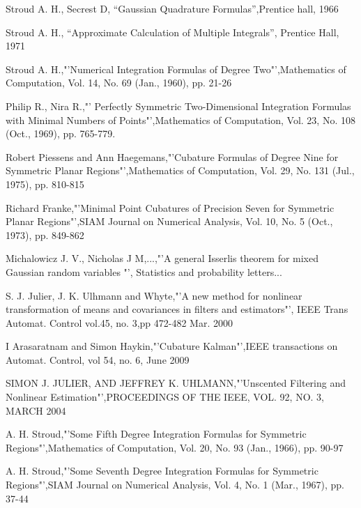 \documentclass[letterpaper, 10 pt, conference]{ieeeconf}  %
\begin{document}
\begin{thebibliography}{99}

Stroud A. H., Secrest D, "`Gaussian Quadrature Formulas"',Prentice hall, 1966

Stroud A. H., "`Approximate Calculation of Multiple Integrals"', Prentice Hall, 1971

Stroud A. H.,"'Numerical Integration Formulas of Degree Two"',Mathematics of Computation, Vol. 14, No. 69 (Jan., 1960), pp. 21-26

Philip R., Nira R.,"' Perfectly Symmetric Two-Dimensional Integration Formulas with Minimal Numbers of Points"',Mathematics of Computation, Vol. 23, No. 108 (Oct., 1969), pp. 765-779.

Robert Piessens and Ann Haegemans,"'Cubature Formulas of Degree Nine for Symmetric Planar Regions"',Mathematics of Computation, Vol. 29, No. 131 (Jul., 1975), pp. 810-815

Richard Franke,"'Minimal Point Cubatures of Precision Seven for Symmetric Planar Regions"',SIAM Journal on Numerical Analysis, Vol. 10, No. 5 (Oct., 1973), pp. 849-862

Michalowicz J. V., Nicholas J M,...,"'A general Isserlis theorem for mixed Gaussian random variables "', Statistics and probability letters...

S. J. Julier, J. K. Ulhmann and Whyte,"'A new method for nonlinear transformation of means and covariances in filters and estimators"', IEEE Trans Automat. Control vol.45, no. 3,pp 472-482 Mar. 2000

I Arasaratnam and Simon Haykin,"'Cubature Kalman"',IEEE transactions on Automat. Control, vol 54, no. 6, June 2009

SIMON J. JULIER, AND JEFFREY K. UHLMANN,"'Unscented Filtering and Nonlinear Estimation"',PROCEEDINGS OF THE IEEE, VOL. 92, NO. 3, MARCH 2004

A. H. Stroud,"'Some Fifth Degree Integration Formulas for Symmetric Regions"',Mathematics of Computation, Vol. 20, No. 93 (Jan., 1966), pp. 90-97

A. H. Stroud,"'Some Seventh Degree Integration Formulas for Symmetric Regions"',SIAM Journal on Numerical Analysis, Vol. 4, No. 1 (Mar., 1967), pp. 37-44


\end{thebibliography}
\end{document}
